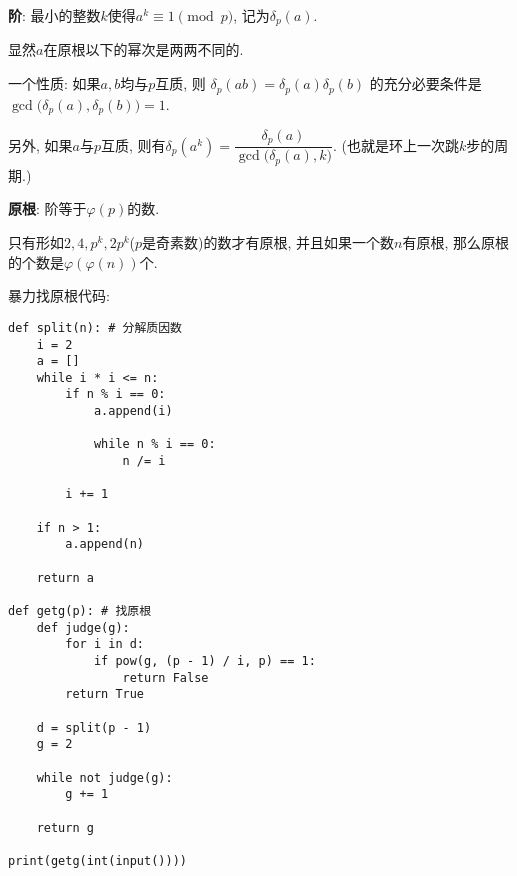\textbf{阶}: 最小的整数$k$使得$a ^ k \equiv 1 \pmod p$, 记为$\delta_p(a)$.

显然$a$在原根以下的幂次是两两不同的.

一个性质: 如果$a, b$均与$p$互质, 则 $ \delta_p(ab)=\delta_p(a)\delta_p(b) $ 的充分必要条件是$ \gcd\big(\delta_p(a),\delta_p(b)\big)=1 $.

另外, 如果$a$与$p$互质, 则有$ \delta_p(a^k)=\dfrac{\delta_p(a)}{\gcd\big(\delta_p(a),k\big)} $. (也就是环上一次跳$k$步的周期.)

\textbf{原根}: 阶等于$\varphi(p)$的数.

只有形如$2, 4, p ^ k, 2 p ^ k$($p$是奇素数)的数才有原根, 并且如果一个数$n$有原根, 那么原根的个数是$\varphi(\varphi(n))$个.

暴力找原根代码:
\begin{verbatim}
def split(n): # 分解质因数
    i = 2
    a = []
    while i * i <= n:
        if n % i == 0:
            a.append(i)

            while n % i == 0:
                n /= i

        i += 1

    if n > 1:
        a.append(n)

    return a
    
def getg(p): # 找原根
    def judge(g):
        for i in d:
            if pow(g, (p - 1) / i, p) == 1:
                return False
        return True

    d = split(p - 1)
    g = 2

    while not judge(g):
        g += 1

    return g

print(getg(int(input())))
\end{verbatim}
